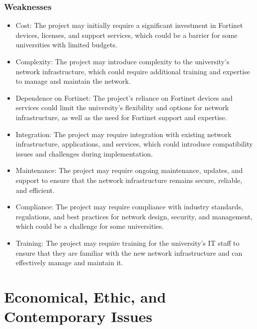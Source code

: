 \documentclass[12pt]{report}
\begin{document}
\subsection{Weaknesses}
\begin{itemize}
    \item Cost: The project may initially require a significant investment in Fortinet devices, licenses, and support services, which could be a barrier for some universities with limited budgets.
    \item Complexity: The project may introduce complexity to the university's network infrastructure, which could require additional training and expertise to manage and maintain the network.
    \item Dependence on Fortinet: The project's reliance on Fortinet devices and services could limit the university's flexibility and options for network infrastructure, as well as the need for Fortinet support and expertise.
    \item Integration: The project may require integration with existing network infrastructure, applications, and services, which could introduce compatibility issues and challenges during implementation.
    \item Maintenance: The project may require ongoing maintenance, updates, and support to ensure that the network infrastructure remains secure, reliable, and efficient.
    \item Compliance: The project may require compliance with industry standards, regulations, and best practices for network design, security, and management, which could be a challenge for some universities.
    \item Training: The project may require training for the university's IT staff to ensure that they are familiar with the new network infrastructure and can effectively manage and maintain it.
\end{itemize}


\chapter{Economical, Ethic, and Contemporary Issues}
\end{document}
